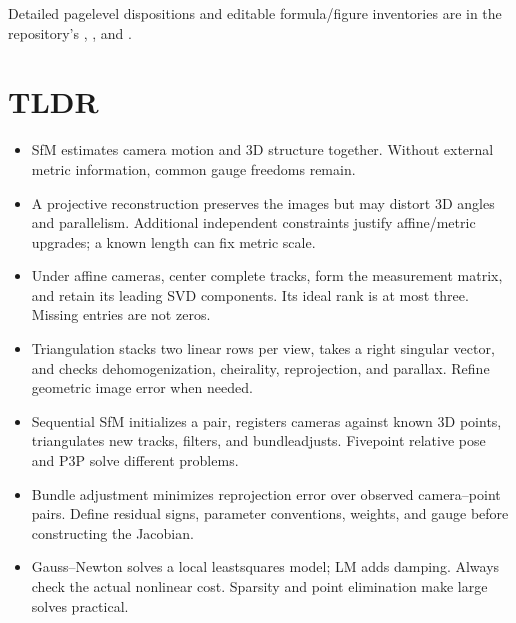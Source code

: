 \documentclass[letterpaper,11pt,english,openany,oneside]{jupyterBook}
\begin{document}
\sphinxAtStartPar
Detailed page\sphinxhyphen{}level dispositions and editable formula/figure inventories are in the repository’s , , and .

\sphinxstepscope


\section{TLDR}
\label{\detokenize{lectures/lecture06/tldr:tldr}}\label{\detokenize{lectures/lecture06/tldr:lec06-tldr}}\label{\detokenize{lectures/lecture06/tldr::doc}}
\sphinxAtStartPar
{}
\begin{itemize}
\item {}
\sphinxAtStartPar
SfM estimates camera motion and 3D structure together. Without external metric information, common gauge freedoms remain.

\item {}
\sphinxAtStartPar
A projective reconstruction preserves the images but may distort 3D angles and parallelism. Additional independent constraints justify affine/metric upgrades; a known length can fix metric scale.

\item {}
\sphinxAtStartPar
Under affine cameras, center complete tracks, form the measurement matrix, and retain its leading SVD components. Its ideal rank is at most three. Missing entries are not zeros.

\item {}
\sphinxAtStartPar
Triangulation stacks two linear rows per view, takes a right singular vector, and checks dehomogenization, cheirality, reprojection, and parallax. Refine geometric image error when needed.

\item {}
\sphinxAtStartPar
Sequential SfM initializes a pair, registers cameras against known 3D points, triangulates new tracks, filters, and bundle\sphinxhyphen{}adjusts. Five\sphinxhyphen{}point relative pose and P3P solve different problems.

\item {}
\sphinxAtStartPar
Bundle adjustment minimizes reprojection error over observed camera–point pairs. Define residual signs, parameter conventions, weights, and gauge before constructing the Jacobian.

\item {}
\sphinxAtStartPar
Gauss–Newton solves a local least\sphinxhyphen{}squares model; LM adds damping. Always check the actual nonlinear cost. Sparsity and point elimination make large solves practical.

\end{itemize}
\end{document}
